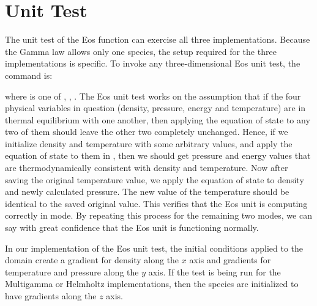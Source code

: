 \section{Unit Test}\label{Sec:Eos Unit Test}

The unit test of the Eos function can exercise all three
implementations. Because the Gamma law allows only one species, the setup
required for the three implementations is specific.
To invoke any three-dimensional \unit{Eos}
unit test, the command is:
\begin{quote}
 
\end{quote}
where  is one of , , .
The \unit{Eos} unit test works on the assumption that if the four physical
variables in question (density, pressure, energy and temperature) are
in thermal equilibrium with one another, then applying the equation of state to
any two of them should leave the other two completely
unchanged. Hence, if we initialize density and temperature with some
arbitrary values, and apply the equation of state to them in
, then we should get pressure and energy values that are
thermodynamically consistent with density and temperature. Now after
saving the original temperature value, we apply the equation of state to
density and newly calculated pressure.  The new value of the temperature
should be identical to the saved original value. This verifies that the \unit{Eos}
unit is computing correctly in  mode. By repeating
this process for the remaining two modes, we can say with great
confidence that the \unit{Eos} unit is functioning normally.

In our implementation of the Eos unit test, the initial conditions applied to the domain
create a gradient for density along the $x$ axis and gradients for
temperature and pressure along the $y$ axis. If the test is being run
for the Multigamma or Helmholtz implementations, then the species are initialized to
have gradients along the $z$ axis.

